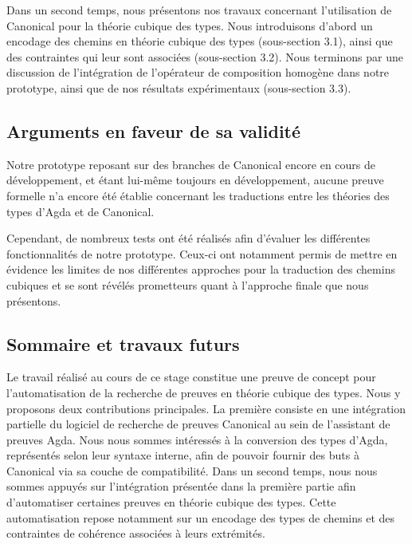\documentclass[11pt]{article}
\begin{document}
Dans un second temps, nous présentons nos travaux concernant l’utilisation de Canonical pour la théorie cubique des types. 
Nous introduisons d’abord un encodage des chemins en théorie cubique des types (sous-section 3.1), 
ainsi que des contraintes qui leur sont associées (sous-section 3.2). 
Nous terminons par une discussion de l’intégration de l’opérateur de composition homogène dans notre prototype, 
ainsi que de nos résultats expérimentaux (sous-section 3.3).




%

\subsection*{Arguments en faveur de sa validité}
Notre prototype reposant sur des branches de Canonical encore en cours de développement, 
et étant lui-même toujours en développement, aucune preuve formelle n’a encore été établie concernant les traductions entre les théories des types d’Agda et de Canonical.

Cependant, de nombreux tests ont été réalisés afin d’évaluer les différentes fonctionnalités de notre prototype. 
Ceux-ci ont notamment permis de mettre en évidence les limites de nos différentes approches pour la traduction des chemins cubiques 
et se sont révélés prometteurs quant à l’approche finale que nous présentons.


%

\subsection*{Sommaire et travaux futurs}

Le travail réalisé au cours de ce stage constitue une preuve de concept pour l’automatisation de la recherche de preuves en théorie cubique des types.
Nous y proposons deux contributions principales. 
La première consiste en une intégration partielle du logiciel de recherche de preuves Canonical au sein de l’assistant de preuves Agda. 
Nous nous sommes intéressés à la conversion des types d’Agda, représentés selon leur syntaxe interne, 
afin de pouvoir fournir des buts à Canonical via sa couche de compatibilité.
Dans un second temps, nous nous sommes appuyés sur l’intégration présentée dans la première partie afin d’automatiser certaines preuves en théorie cubique des types. 
Cette automatisation repose notamment sur un encodage des types de chemins et des contraintes de cohérence associées à leurs extrémités.
\end{document}
